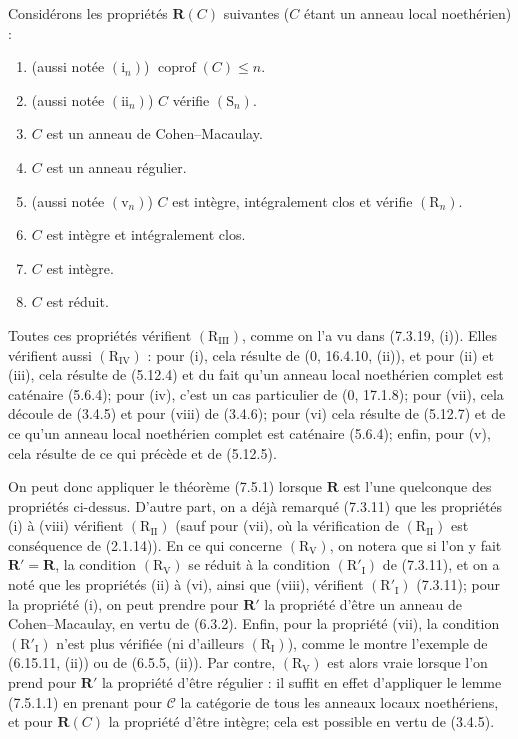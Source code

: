 \begin{examples}[7.5.3]
\label{IV.2.s7.5.3-fr}
Considérons les propriétés $\boldsymbol R(C)$ suivantes ($C$ étant un anneau
local noethérien) :
\begin{enumerate}
\item[\emph{(i)}] (aussi notée $(\mathrm i_n)$) $\operatorname{coprof}(C)\leq n$.
\item[\emph{(ii)}] (aussi notée $(\mathrm{ii}_n)$) $C$ vérifie $(\mathrm S_n)$.
\item[\emph{(iii)}] $C$ est un anneau de Cohen--Macaulay.
\item[\emph{(iv)}] $C$ est un anneau régulier.
\item[\emph{(v)}] (aussi notée $(\mathrm v_n)$) $C$ est intègre, intégralement
clos et vérifie $(\mathrm R_n)$.
\item[\emph{(vi)}] $C$ est intègre et intégralement clos.
\item[\emph{(vii)}] $C$ est intègre.
\item[\emph{(viii)}] $C$ est réduit.
\end{enumerate}
Toutes ces propriétés vérifient $(\mathrm R_{\mathrm{III}})$, comme on l'a vu
dans (7.3.19, (i)). Elles vérifient aussi $(\mathrm R_{\mathrm{IV}})$ : pour
(i), cela résulte de (0, 16.4.10, (ii)), et pour (ii) et (iii), cela résulte de
(5.12.4) et du fait qu'un anneau local noethérien complet est caténaire
(5.6.4); pour (iv), c'est un cas particulier de (0, 17.1.8); pour (vii), cela
découle de (3.4.5) et pour (viii) de (3.4.6); pour (vi) cela résulte de
(5.12.7) et de ce qu'un anneau local noethérien complet est caténaire (5.6.4);
enfin, pour (v), cela résulte de ce qui précède et de (5.12.5).

On peut donc appliquer le théorème (7.5.1) lorsque $\boldsymbol R$ est l'une
quelconque des propriétés ci-dessus. D'autre part, on a déjà remarqué (7.3.11)
que les propriétés (i) à (viii) vérifient $(\mathrm R_{\mathrm{II}})$ (sauf
pour (vii), où la vérification de $(\mathrm R_{\mathrm{II}})$ est conséquence
de (2.1.14)). En ce qui concerne $(\mathrm R_{\mathrm V})$, on notera que si
l'on y fait $\boldsymbol R'=\boldsymbol R$, la condition
$(\mathrm R_{\mathrm V})$ se réduit à la condition
$(\mathrm R'_{\mathrm I})$ de (7.3.11), et on a noté que les propriétés (ii) à
(vi), ainsi que (viii), vérifient $(\mathrm R'_{\mathrm I})$ (7.3.11); pour la
propriété (i), on peut prendre pour $\boldsymbol R'$ la propriété d'être un
anneau de Cohen--Macaulay, en vertu de (6.3.2). Enfin, pour la propriété (vii),
la condition $(\mathrm R'_{\mathrm I})$ n'est plus vérifiée (ni d'ailleurs
$(\mathrm R_{\mathrm I})$), comme le montre l'exemple de (6.15.11, (ii)) ou de
(6.5.5, (ii)). Par contre, $(\mathrm R_{\mathrm V})$ est alors vraie lorsque
l'on prend pour $\boldsymbol R'$ la propriété d'être régulier : il suffit en
effet d'appliquer le lemme (7.5.1.1) en prenant pour $\mathcal C$ la catégorie
de tous les anneaux locaux noethériens, et pour $\boldsymbol R(C)$ la propriété
d'être intègre; cela est possible en vertu de (3.4.5).


\end{examples}
